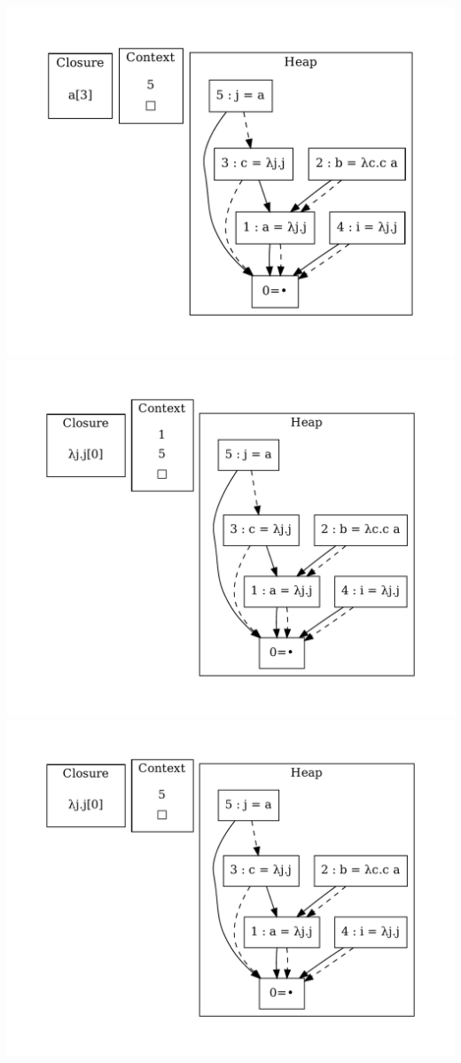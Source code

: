 \includegraphics[width=\linewidth/2]{figures/20.pdf}
\includegraphics[width=\linewidth/2]{figures/21.pdf}
\includegraphics[width=\linewidth/2]{figures/22.pdf}
